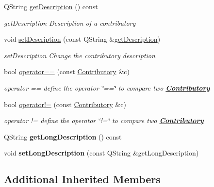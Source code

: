 \begin{DoxyCompactItemize}
Q\-String \hyperlink{classModels_1_1Contributory_ae2b936f2fb1ccad2009eae9b5d12fc02}{get\-Description} () const 
\begin{DoxyCompactList}\small\item\em get\-Description Description of a contributory \end{DoxyCompactList}\item 
void \hyperlink{classModels_1_1Contributory_a12d4199fa7175c0b43f62eddf7c3d69e}{set\-Description} (const Q\-String \&\hyperlink{classModels_1_1Contributory_ae2b936f2fb1ccad2009eae9b5d12fc02}{get\-Description})
\begin{DoxyCompactList}\small\item\em set\-Description Change the contributory description \end{DoxyCompactList}\item 
bool \hyperlink{classModels_1_1Contributory_ad49c8b9cdf7254069e07f2238b42c8f3}{operator==} (const \hyperlink{classModels_1_1Contributory}{Contributory} \&c)
\begin{DoxyCompactList}\small\item\em operator == define the operator \char`\"{}==\char`\"{} to compare two {\bfseries \hyperlink{classModels_1_1Contributory}{Contributory}} \end{DoxyCompactList}\item 
bool \hyperlink{classModels_1_1Contributory_a0808e6453b222f62d3288361dcb56d16}{operator!=} (const \hyperlink{classModels_1_1Contributory}{Contributory} \&c)
\begin{DoxyCompactList}\small\item\em operator != define the operator \char`\"{}!=\char`\"{} to compare two {\bfseries \hyperlink{classModels_1_1Contributory}{Contributory}} \end{DoxyCompactList}\item 
\hypertarget{classModels_1_1Contributory_abcd8dce3a913d558b73f17f16d5beb7a}{Q\-String {\bfseries get\-Long\-Description} () const }\label{classModels_1_1Contributory_abcd8dce3a913d558b73f17f16d5beb7a}

\item 
\hypertarget{classModels_1_1Contributory_a40023cef80233eaa814d7bb41d668322}{void {\bfseries set\-Long\-Description} (const Q\-String \&get\-Long\-Description)}\label{classModels_1_1Contributory_a40023cef80233eaa814d7bb41d668322}

\end{DoxyCompactItemize}
\subsection*{Additional Inherited Members}


